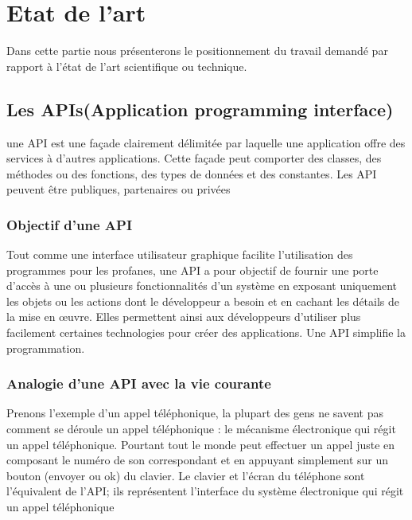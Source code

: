 
\chapter{Etat de l’art} %

\label{Chaptre3} %

Dans cette partie nous présenterons le positionnement du travail demandé par rapport à l’état de l’art scientifique ou technique.

\section{Les APIs(Application programming interface)}

une API est une façade clairement délimitée par laquelle une application offre des services à d’autres applications. Cette façade peut comporter des classes, des méthodes ou des fonctions, des types de données et
des constantes. Les API peuvent être publiques, partenaires ou privées

\subsection{Objectif d’une API}
Tout comme une interface utilisateur graphique facilite l’utilisation des programmes pour les profanes, une
API a pour objectif de fournir une porte d’accès à une ou plusieurs fonctionnalités d’un système en exposant
uniquement les objets ou les actions dont le développeur a besoin et en cachant les détails de la mise en
œuvre. Elles permettent ainsi aux développeurs d’utiliser plus facilement certaines technologies pour créer
des applications. Une API simplifie la programmation.



\subsection{Analogie d’une API avec la vie courante}

Prenons l’exemple d’un appel téléphonique, la plupart des gens ne savent pas comment se déroule un appel
téléphonique : le mécanisme électronique qui régit un appel téléphonique. Pourtant tout le monde peut
effectuer un appel juste en composant le numéro de son correspondant et en appuyant simplement sur
un bouton (envoyer ou ok) du clavier. Le clavier et l’écran du téléphone sont l’équivalent de l’API; ils
représentent l’interface du système électronique qui régit un appel téléphonique

